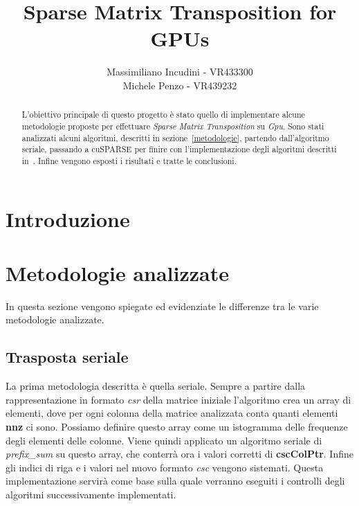 \documentclass[]{IEEEtran}
\title{Sparse Matrix Transposition for GPUs}
\author{Massimiliano Incudini - VR433300\\Michele Penzo - VR439232}
\begin{document}
\maketitle

\begin{abstract}
	L'obiettivo principale di questo progetto è stato quello di implementare alcune metodologie proposte per effettuare \textit{Sparse Matrix Transposition} su \textit{Gpu}.
	Sono stati analizzati alcuni algoritmi, descritti in sezione~\ref{metodologie}, partendo dall'algoritmo seriale, passando a cuSPARSE per finire con l'implementazione degli algoritmi descritti in~\cite{parallelTrans}.
	Infine vengono esposti i risultati e tratte le conclusioni.
\end{abstract}


\section{Introduzione}


 
\section{Metodologie analizzate}
\label{metodologie}
	In questa sezione vengono spiegate ed evidenziate le differenze tra le varie metodologie analizzate. 
		
	\subsection{Trasposta seriale}
	La prima metodologia descritta è quella seriale. Sempre a partire dalla rappresentazione in formato \textit{csr} della matrice iniziale l'algoritmo crea un array di elementi, dove per ogni colonna della matrice analizzata conta quanti elementi \textbf{nnz} ci sono. Possiamo definire questo array come un istogramma delle frequenze degli elementi delle colonne. Viene quindi applicato un algoritmo seriale di \textit{prefix\_sum} su questo array, che conterrà ora i valori corretti di \textbf{cscColPtr}. Infine gli indici di riga e i valori nel nuovo formato \textit{csc} vengono sistemati.\newline
	Questa implementazione servirà come base sulla quale verranno eseguiti i controlli degli algoritmi successivamente implementati.
	
\end{document}
